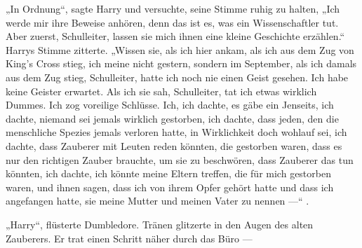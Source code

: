 „In Ordnung“, sagte Harry und versuchte, seine Stimme ruhig zu halten,
„Ich werde mir ihre Beweise anhören, denn das ist es, was ein Wissenschaftler tut. Aber zuerst, Schulleiter, lassen sie mich ihnen eine kleine Geschichte erzählen.“ Harrys Stimme zitterte.
„Wissen sie, als ich hier ankam, als ich aus dem Zug von King’s Cross stieg, ich meine nicht gestern, sondern im September, als ich damals aus dem Zug stieg, Schulleiter, hatte ich noch nie einen Geist gesehen. Ich habe keine Geister erwartet. Als ich sie sah, Schulleiter, tat ich etwas wirklich Dummes. Ich zog voreilige Schlüsse. Ich, ich dachte, es gäbe ein Jenseits, ich dachte, niemand sei jemals wirklich gestorben, ich dachte, dass jeden, den die menschliche Spezies jemals verloren hatte, in Wirklichkeit doch wohlauf sei, ich dachte, dass Zauberer mit Leuten reden könnten, die gestorben waren, dass es nur den richtigen Zauber brauchte, um sie zu beschwören, dass Zauberer das tun könnten, ich dachte, ich könnte meine Eltern treffen, die für mich gestorben waren, und ihnen sagen, dass ich von ihrem Opfer gehört hatte und dass ich angefangen hatte, sie meine Mutter und meinen Vater zu nennen —“ .

„Harry“, flüsterte Dumbledore. Tränen glitzerte in den Augen des alten Zauberers. Er trat einen Schritt näher durch das Büro —

